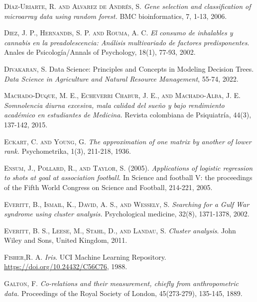 \begin{thebibliography}{99}
\textsc{Díaz-Uriarte, R. and Alvarez de Andrés, S. }\emph{ Gene selection and classification of microarray data using random forest.} BMC bioinformatics, 7, 1-13, 2006.

\textsc{Diez, J. P., Hernandis, S. P. and Rouma, A. C. } \emph{El consumo de inhalables y cannabis en la preadolescencia: Análisis multivariado de factores predisponentes}. Anales de Psicología/Annals of Psychology, 18(1), 77-93, 2002.

\textsc{Divakaran, S. }Data Science: Principles and Concepts in Modeling Decision Trees.\emph{ Data Science in Agriculture and Natural Resource Management}, 55-74, 2022.


 \textsc{Machado-Duque, M. E., Echeverri Chabur, J. E., and Machado-Alba, J. E. } \emph{Somnolencia diurna excesiva, mala calidad del sueño y bajo rendimiento académico en estudiantes de Medicina.} Revista colombiana de Psiquiatría, 44(3), 137-142, 2015.


\textsc{Eckart, C. and Young, G. } \emph{The approximation of one matrix by another of lower rank.} Psychometrika, 1(3), 211-218, 1936.

\textsc{Ensum, J., Pollard, R., and Taylor, S. (2005).}\emph{ Applications of logistic regression to shots at goal at association football.} In Science and football V: the proceedings of the Fifth World Congress on Science and Football, 214-221, 2005.

 \textsc{Everitt, B., Ismail, K., David, A. S., and Wessely, S. } \emph{Searching for a Gulf War syndrome using cluster analysis.} Psychological medicine, 32(8), 1371-1378, 2002.


\textsc{Everitt, B. S., Leese, M., Stahl, D., and Landau, S.} \emph{Cluster analysis}. John Wiley and Sons, United Kingdom, 2011. 

 \textsc{Fisher,R. A.} \emph{Iris}. UCI Machine Learning Repository. \url{https://doi.org/10.24432/C56C76}, 1988.

 \textsc{Galton, F. } \emph{Co-relations and their measurement, chiefly from anthropometric data.} Proceedings of the Royal Society of London, 45(273-279), 135-145, 1889.


\end{thebibliography}
